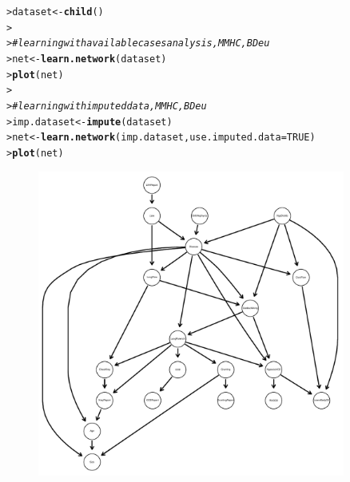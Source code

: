 \documentclass{article}\usepackage[]{graphicx}\usepackage[]{color}
\makeatletter
\newcommand{\hlnum}[1]{\textcolor[rgb]{0.686,0.059,0.569}{#1}}%
\newcommand{\hlcom}[1]{\textcolor[rgb]{0.678,0.584,0.686}{\textit{#1}}}%
\newcommand{\hlstd}[1]{\textcolor[rgb]{0.345,0.345,0.345}{#1}}%
\newcommand{\hlkwb}[1]{\textcolor[rgb]{0.69,0.353,0.396}{#1}}%
\newcommand{\hlkwc}[1]{\textcolor[rgb]{0.333,0.667,0.333}{#1}}%
\newcommand{\hlkwd}[1]{\textcolor[rgb]{0.737,0.353,0.396}{\textbf{#1}}}%
\newenvironment{kframe}{%
 \def\at@end@of@kframe{}%
 \ifinner\ifhmode%
  \def\at@end@of@kframe{\end{minipage}}%
  \begin{minipage}{\columnwidth}%
 \fi\fi%
 \def\FrameCommand##1{\hskip\@totalleftmargin \hskip-\fboxsep
 \colorbox{shadecolor}{##1}\hskip-\fboxsep
     \hskip-\linewidth \hskip-\@totalleftmargin \hskip\columnwidth}%
 \MakeFramed {\advance\hsize-\width
   \@totalleftmargin\z@ \linewidth\hsize
   \@setminipage}}%
 {\par\unskip\endMakeFramed%
 \at@end@of@kframe}
\newenvironment{knitrout}{}{} %
\makeatother
\begin{document}
\begin{knitrout}
\color{fgcolor}\begin{kframe}
\begin{alltt}
\hlstd{> }\hlstd{dataset} \hlkwb{<-} \hlkwd{child}\hlstd{()}
\hlstd{> }
\hlstd{> }\hlcom{# learning with available cases analysis, MMHC, BDeu}
\hlstd{> }\hlstd{net} \hlkwb{<-} \hlkwd{learn.network}\hlstd{(dataset)}
\hlstd{> }\hlkwd{plot}\hlstd{(net)}
\hlstd{> }
\hlstd{> }\hlcom{# learning with imputed data, MMHC, BDeu}
\hlstd{> }\hlstd{imp.dataset} \hlkwb{<-} \hlkwd{impute}\hlstd{(dataset)}
\hlstd{> }\hlstd{net} \hlkwb{<-} \hlkwd{learn.network}\hlstd{(imp.dataset,} \hlkwc{use.imputed.data} \hlstd{=} \hlnum{TRUE}\hlstd{)}
\hlstd{> }\hlkwd{plot}\hlstd{(net)}
\end{alltt}
\end{kframe}
\end{knitrout}
\begin{figure}[!h]%
\centerline{\includegraphics[width=0.9\textwidth]{childtest-1.pdf}}
\end{figure}
\end{document}
